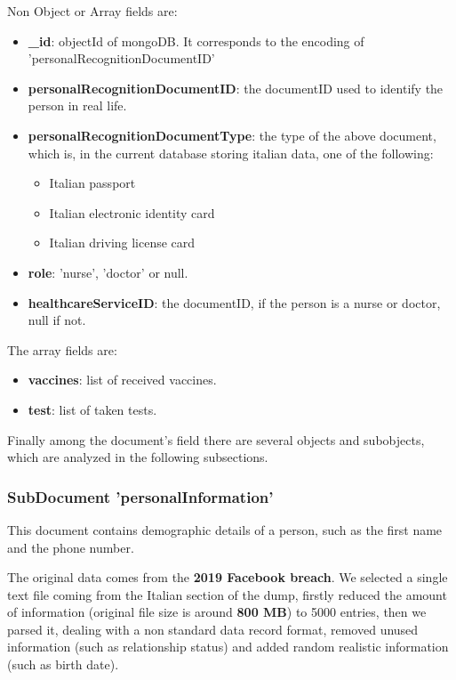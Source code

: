 \documentclass{article}[IEEEtran]
\begin{document}
Non Object or Array fields are:

\begin{itemize}
    \item \textbf{\_id}: objectId of mongoDB. It corresponds to the encoding of 'personalRecognitionDocumentID'
    \item \textbf{personalRecognitionDocumentID}: the documentID used to identify the person in real life.
    \item \textbf{personalRecognitionDocumentType}: the type of the above document, which is, in the current database storing italian data, one of the following:
    \begin{itemize}
        \item Italian passport
        \item Italian electronic identity card
        \item Italian driving license card
    \end{itemize}
    \item \textbf{role}: 'nurse', 'doctor' or null.
    \item \textbf{healthcareServiceID}: the documentID, if the person is a nurse or doctor, null if not.
\end{itemize}

The array fields are:

\begin{itemize}
    \item \textbf{vaccines}: list of received vaccines.
    \item \textbf{test}: list of taken tests.
\end{itemize}

Finally among the document's field there are several objects and subobjects, which are analyzed in the following subsections.

\subsubsection{SubDocument 'personalInformation'}

This document contains demographic details of a person, such as the first name and the phone number.

The original data comes from the \textbf{2019 Facebook breach}\cite{facebookleak}. We selected a single text file coming from the Italian section of the dump, firstly reduced the amount of information (original file size is around \textbf{800 MB}) to 5000 entries, then we parsed it, dealing with a non standard data record format, removed unused information (such as relationship status) and added random realistic information (such as birth date).
\end{document}
